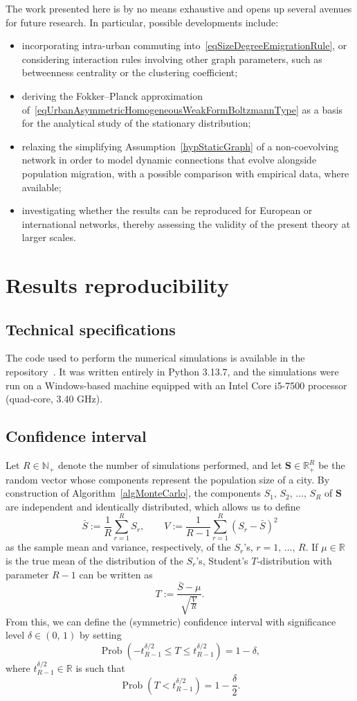 \documentclass[a4paper]{article}
\newcommand{\N}{\mathbb{N}}
\newcommand{\R}{\mathbb{R}}
\begin{document}
The work presented here is by no means exhaustive and opens up several avenues for future research. In particular, possible developments include:
\begin{itemize}
\item incorporating intra-urban commuting into~\eqref{eqSizeDegreeEmigrationRule}, or considering interaction rules involving other graph parameters, such as betweenness centrality or the clustering coefficient;
\item deriving the Fokker--Planck approximation of~\eqref{eqUrbanAsymmetricHomogeneousWeakFormBoltzmannType} as a basis for the analytical study of the stationary distribution;
\item relaxing the simplifying Assumption~\ref{hypStaticGraph} of a non-coevolving network in order to model dynamic connections that evolve alongside population migration, with a possible comparison with empirical data, where available;
\item investigating whether the results can be reproduced for European or international networks, thereby assessing the validity of the present theory at larger scales.
\end{itemize}

\appendix
    
\section{Results reproducibility}

\subsection{Technical specifications}
The code used to perform the numerical simulations is available in the repository~\cite{Taralli2026}. It was written entirely in Python 3.13.7, and the simulations were run on a Windows-based machine equipped with an Intel Core i5-7500 processor (quad-core, 3.40 GHz).

\subsection{Confidence interval}
Let $R\in\N_+$ denote the number of simulations performed, and let $\mathbf S\in\R_+^R$ be the random vector whose components represent the population size of a city. By construction of Algorithm~\ref{algMonteCarlo}, the components $S_1,\,S_2,\,\dots,\,S_R$ of $\mathbf S$ are independent and identically distributed, which allows us to define
$$ \bar S:=\frac{1}{R}\sum_{r=1}^{R}S_r, \qquad V:=\frac{1}{R-1}\sum_{r=1}^R{(S_r-\bar S)}^2 $$
as the sample mean and variance, respectively, of the $S_r$'s, $r=1,\,\dots,\,R$. If $\mu\in\R$ is the true mean of the distribution of the $S_r$'s, Student's \(T\)-distribution with parameter $R-1$ can be written as
$$ T:=\frac{\bar S-\mu}{\sqrt{\frac{V}{R}}}. $$
From this, we can define the (symmetric) confidence interval with significance level $\delta\in (0,\,1)$ by setting
$$ \operatorname{Prob}\!\left(-t_{R-1}^{\delta/2}\leq T\leq t_{R-1}^{\delta/2}\right)=1-\delta, $$
where $t_{R-1}^{\delta/2}\in\R$ is such that
$$ \operatorname{Prob}\!\left(T<t_{R-1}^{\delta/2}\right)=1-\frac{\delta}{2}. $$
\end{document}
